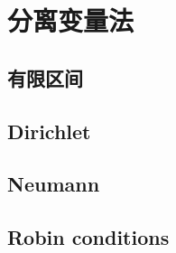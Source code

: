 \section{分离变量法}
\label{b2:sec:1001}


\subsection{有限区间}
\label{b2:subsec:100101}

\subsection{Dirichlet}
\label{b2:subsec:100102}

\subsection{Neumann}
\label{b2:subsec:100103}

\subsection{Robin conditions}
\label{b2:subsec:100104}


